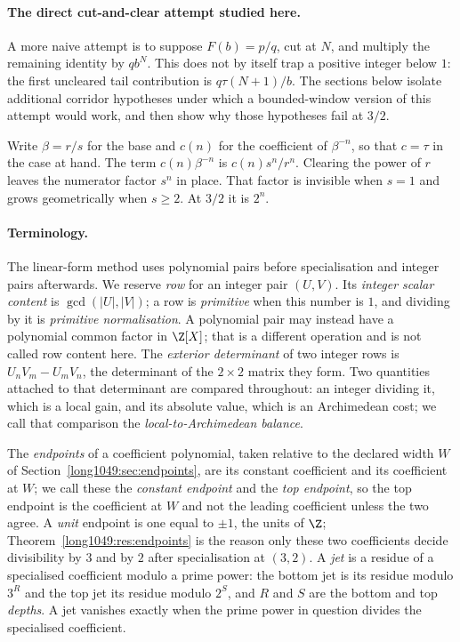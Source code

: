 \documentclass[11pt]{article}
\begin{document}
\paragraph{The direct cut-and-clear attempt studied here.}
A more naive attempt is to suppose $F(b)=p/q$, cut at $N$, and multiply the
remaining identity by $qb^N$.  This does not by itself trap a positive integer
below $1$: the first uncleared tail contribution is
$q\tau(N+1)/b$.  The sections below isolate additional corridor hypotheses
under which a bounded-window version of this attempt would work, and then show
why those hypotheses fail at $3/2$.

Write $\beta=r/s$ for the base and $c(n)$ for the coefficient of $\beta^{-n}$,
so that $c=\tau$ in the case at hand.  The term $c(n)\beta^{-n}$ is
$c(n)s^{n}/r^{n}$.  Clearing the
power of $r$ leaves the numerator factor $s^{n}$ in place.  That factor is
invisible when $s=1$ and grows geometrically when $s\ge2$.  At $3/2$ it is
$2^{n}$.

\paragraph{Terminology.}
The linear-form method uses polynomial pairs before specialisation and integer
pairs afterwards.  We reserve \emph{row} for an integer pair $(U,V)$.  Its
\emph{integer scalar content} is $\gcd(|U|,|V|)$; a row is \emph{primitive}
when this number is $1$, and dividing by it is \emph{primitive normalisation}.
A polynomial pair may instead have a polynomial common factor in $\Z[X]$;
that is a different operation and is not called row content here.  The
\emph{exterior determinant} of two integer rows is
$U_{n}V_{m}-U_{m}V_{n}$, the determinant of the $2\times2$ matrix they form.
Two quantities attached to that determinant are compared throughout: an
integer dividing it, which is a local gain, and its absolute value, which is an
Archimedean cost; we call that comparison the \emph{local-to-Archimedean
balance}.

The \emph{endpoints} of a coefficient polynomial, taken relative to
the declared width $W$ of Section~\ref{long1049:sec:endpoints}, are its constant
coefficient and its coefficient at $W$; we call these the \emph{constant
endpoint} and the \emph{top endpoint}, so the top endpoint is the coefficient
at $W$ and not the leading coefficient unless the two agree.  A \emph{unit}
endpoint is one equal
to $\pm1$, the units of $\Z$; Theorem~\ref{long1049:res:endpoints} is the reason only these
two coefficients decide divisibility by $3$ and by $2$ after specialisation at
$(3,2)$.  A \emph{jet} is a
residue of a specialised coefficient modulo a prime power: the bottom jet is
its residue modulo $3^{R}$ and the top jet its residue modulo $2^{S}$, and $R$
and $S$ are the bottom and top \emph{depths}.  A jet vanishes exactly when the
prime power in question divides the specialised coefficient.
\end{document}
